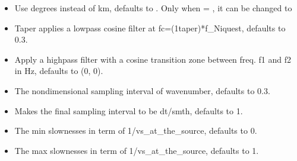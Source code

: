 \documentclass[a4paper,10pt,english,openany]{sphinxmanual}
\begin{document}
\begin{itemize}
\item {} 
Use degrees instead of km, defaults to . Only when  = , it can be changed to 

\end{itemize}

\begin{itemize}
\item {} 
Taper applies a low\sphinxhyphen{}pass cosine filter at fc=(1\sphinxhyphen{}taper)*f\_Niquest, defaults to 0.3.

\end{itemize}

\begin{itemize}
\item {} 
Apply a high\sphinxhyphen{}pass filter with a cosine transition zone between freq. f1 and f2 in Hz, defaults to (0, 0).

\end{itemize}

\begin{itemize}
\item {} 
The non\sphinxhyphen{}dimensional sampling interval of wavenumber, defaults to 0.3.

\end{itemize}

\begin{itemize}
\item {} 
Makes the final sampling interval to be dt/smth, defaults to 1.

\end{itemize}

\begin{itemize}
\item {} 
The min slownesses in term of 1/vs\_at\_the\_source, defaults to 0.

\end{itemize}

\begin{itemize}
\item {} 
The max slownesses in term of 1/vs\_at\_the\_source, defaults to 1.

\end{itemize}
\end{document}
